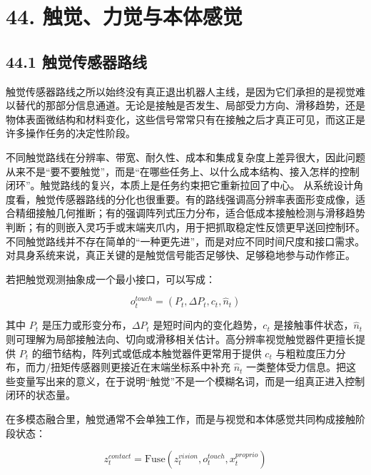 \chapter*{44. 触觉、力觉与本体感觉}

\section*{44.1 触觉传感器路线}


触觉传感器路线之所以始终没有真正退出机器人主线，是因为它们承担的是视觉难以替代的那部分信息通道。无论是接触是否发生、局部受力方向、滑移趋势，还是物体表面微结构和材料变化，这些信号常常只有在接触之后才真正可见，而这正是许多操作任务的决定性阶段。

不同触觉路线在分辨率、带宽、耐久性、成本和集成复杂度上差异很大，因此问题从来不是“要不要触觉”，而是“在哪些任务上、以什么成本结构、接入怎样的控制闭环”。触觉路线的复兴，本质上是任务约束把它重新拉回了中心。 从系统设计角度看，触觉传感器路线的分化也很重要。有的路线强调高分辨率表面形变成像，适合精细接触几何推断；有的强调阵列式压力分布，适合低成本接触检测与滑移趋势判断；有的则嵌入灵巧手或末端夹爪内，用于把抓取稳定性反馈更早送回控制环。不同触觉路线并不存在简单的“一种更先进”，而是对应不同时间尺度和接口需求。对具身系统来说，真正关键的是触觉信号能否足够快、足够稳地参与动作修正。

若把触觉观测抽象成一个最小接口，可以写成：

\begin{equation*}
o_t^{touch} = (P_t, \Delta P_t, c_t, \hat{n}_t)
\end{equation*}

其中 \(P_t\) 是压力或形变分布，\(\Delta P_t\) 是短时间内的变化趋势，\(c_t\) 是接触事件状态，\(\hat{n}_t\) 则可理解为局部接触法向、切向或滑移相关估计。高分辨率视觉触觉器件更擅长提供 \(P_t\) 的细节结构，阵列式或低成本触觉器件更常用于提供 \(c_t\) 与粗粒度压力分布，而力/扭矩传感器则更接近在末端坐标系中补充 \(\hat{n}_t\) 一类整体受力信息。把这些变量写出来的意义，在于说明“触觉”不是一个模糊名词，而是一组真正进入控制闭环的状态量。

在多模态融合里，触觉通常不会单独工作，而是与视觉和本体感觉共同构成接触阶段状态：

\begingroup
\footnotesize
\begin{equation*}
z_t^{contact} = \mathrm{Fuse}(z_t^{vision}, o_t^{touch}, x_t^{proprio})
\end{equation*}
\endgroup

